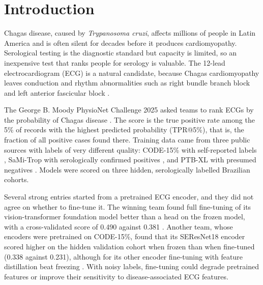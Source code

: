 \documentclass{iopjournal}
\makeatletter
\newcommand{\tpr}{TPR@5\%}
\makeatother
\begin{document}
\section{Introduction}
Chagas disease, caused by \textit{Trypanosoma cruzi}, affects millions of people in Latin America and is often silent for decades before it produces cardiomyopathy. Serological testing is the diagnostic standard but capacity is limited, so an inexpensive test that ranks people for serology is valuable. The 12-lead electrocardiogram (ECG) is a natural candidate, because Chagas cardiomyopathy leaves conduction and rhythm abnormalities such as right bundle branch block and left anterior fascicular block \citep{jidling2023}.

The George B. Moody PhysioNet Challenge 2025 asked teams to rank ECGs by the probability of Chagas disease \citep{reyna2025,goldberger2000}. The score is the true positive rate among the 5\% of records with the highest predicted probability (\tpr), that is, the fraction of all positive cases found there. Training data came from three public sources with labels of very different quality: CODE-15\% with self-reported labels \citep{ribeiro2020}, SaMi-Trop with serologically confirmed positives \citep{cardoso2016}, and PTB-XL with presumed negatives \citep{wagner2020}. Models were scored on three hidden, serologically labelled Brazilian cohorts.

Several strong entries started from a pretrained ECG encoder, and they did not agree on whether to fine-tune it. The winning team found full fine-tuning of its vision-transformer foundation model better than a head on the frozen model, with a cross-validated score of 0.490 against 0.381 \citep{vansantvliet2025}. Another team, whose encoders were pretrained on CODE-15\%, found that its SEResNet18 encoder scored higher on the hidden validation cohort when frozen than when fine-tuned (0.338 against 0.231), although for its other encoder fine-tuning with feature distillation beat freezing \citep{wang2025}.
With noisy labels, fine-tuning could degrade pretrained features or improve their sensitivity to disease-associated ECG features.
\end{document}
